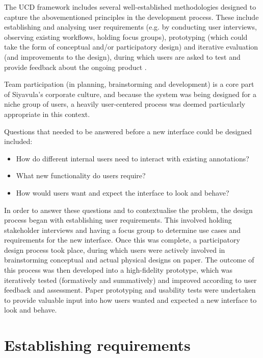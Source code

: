 The UCD framework includes several well-established methodologies designed to capture the abovementioned principles in the development process. These include establishing and analysing user requirements (e.g. by conducting user interviews, observing existing workflows, holding focus groups), prototyping (which could take the form of conceptual and/or participatory design) and iterative evaluation (and improvements to the design), during which users are asked to test and provide feedback about the ongoing product \citep[p. 330 - 331]{RogersPreece}. 

Team participation (in planning, brainstorming and development) is a core part of Siyavula's corporate culture, and because the system was being designed for a niche group of users, a heavily user-centered process was deemed particularly appropriate in this context.

Questions that needed to be answered before a new interface could be designed included: 
\begin{itemize}
 \item How do different internal users need to interact with existing annotations? 
 \item What new functionality do users require? 
 \item How would users want and expect the interface to look and behave?
\end{itemize}

In order to answer these questions and to contextualise the problem, the design process began with establishing user requirements. This involved holding stakeholder interviews and having a focus group to determine use cases and requirements for the new interface. Once this was complete, a participatory design process took place, during which users were actively involved in brainstorming conceptual and actual physical designs on paper. The outcome of this process was then developed into a high-fidelity prototype, which was iteratively tested (formatively and summatively) and improved according to user feedback and assessment. Paper prototyping and usability tests were undertaken to provide valuable input into how users wanted and expected a new interface to look and behave. 

\section{Establishing requirements}
 

